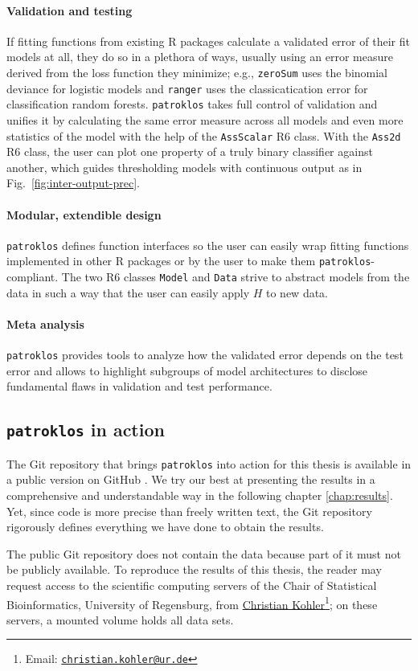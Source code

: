\paragraph{Validation and testing} 
If fitting functions from existing R packages calculate a validated error of 
their fit models at all, they do so in a plethora of ways, usually using an error measure derived 
from the loss function they minimize; e.g., \texttt{zeroSum} uses the binomial deviance for 
logistic models and \texttt{ranger} uses the classicatication error for classification random 
forests. \texttt{patroklos} takes 
full control of validation and unifies it
by calculating the same error measure across all models and even more statistics of the model
with the help of the \texttt{AssScalar} R6 class. With the \texttt{Ass2d} R6 class, the 
user can plot one property of a truly binary classifier against another, which guides 
thresholding models with continuous output as in Fig.\ \ref{fig:inter-output-prec}.

\paragraph{Modular, extendible design} 
\texttt{patroklos} defines function interfaces so the user 
can easily wrap fitting functions implemented in other R packages or by the user to make 
them \texttt{patroklos}-compliant. The two R6 classes \texttt{Model} and \texttt{Data}
strive to abstract models from the data in such a way that the user can easily apply $H$ to new 
data.

\paragraph{Meta analysis} 
\texttt{patroklos} provides tools to analyze how the validated error depends on the test error and 
allows to highlight subgroups of model architectures to disclose fundamental flaws in validation 
and test performance.

\subsection{\texttt{patroklos} in action}

The Git repository that brings \texttt{patroklos} into action for this thesis is available in a 
public version on GitHub \cite{thesis-gh}. We try our best at presenting the results in a 
comprehensive and understandable way in the following chapter \ref{chap:results}. Yet, since code 
is more precise than freely written text, the Git repository rigorously defines everything we have 
done to obtain the results.

The public Git repository does not contain the data because part of it must not be publicly 
available. To reproduce the results of this thesis, the reader may request access to the scientific 
computing servers of the Chair of Statistical Bioinformatics, University of Regensburg, from 
\href{mailto:christian.kohler@ur.de}{Christian Kohler}\footnote{Email: 
\href{mailto:christian.kohler@ur.de}{\texttt{christian.kohler@ur.de}}}; on these servers, a mounted
volume holds all data sets.
